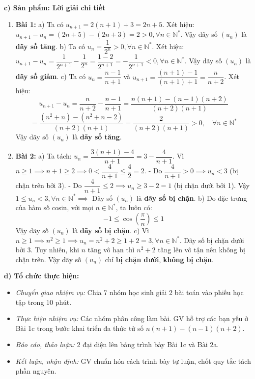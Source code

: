 \documentclass[12pt, a4paper]{article}
\begin{document}
\noindent \textbf{c) Sản phẩm: Lời giải chi tiết}  
\begin{enumerate}[leftmargin=0.6cm]  
    \item \textbf{Bài 1:}  
    a) Ta có $u_{n+1} = 2(n + 1) + 3 = 2n + 5$.  
    Xét hiệu: $u_{n+1} - u_n = (2n + 5) - (2n + 3) = 2 > 0, \forall n \in \mathbb{N}^*$.  
    Vậy dãy số $(u_n)$ là \textbf{dãy số tăng}.  
    b) Ta có $u_n = \dfrac{1}{2^n} > 0, \forall n \in \mathbb{N}^*$.  
    Xét hiệu: $u_{n+1} - u_n = \dfrac{1}{2^{n+1}} - \dfrac{1}{2^n} = \dfrac{1 - 2}{2^{n+1}} = -\dfrac{1}{2^{n+1}} < 0, \forall n \in \mathbb{N}^*$.  
    Vậy dãy số $(u_n)$ là \textbf{dãy số giảm}.  
    c) Ta có $u_n = \dfrac{n - 1}{n + 1}$ và $u_{n+1} = \dfrac{(n + 1) - 1}{(n + 1) + 1} = \dfrac{n}{n + 2}$.  
    Xét hiệu:  
    $$u_{n+1} - u_n = \dfrac{n}{n + 2} - \dfrac{n - 1}{n + 1} = \dfrac{n(n + 1) - (n - 1)(n + 2)}{(n + 2)(n + 1)}$$  
    $$= \dfrac{(n^2 + n) - (n^2 + n - 2)}{(n + 2)(n + 1)} = \dfrac{2}{(n + 2)(n + 1)} > 0, \quad \forall n \in \mathbb{N}^*$$  
    Vậy dãy số $(u_n)$ là \textbf{dãy số tăng}.  
  
    \item \textbf{Bài 2:}  
    a) Ta tách: $u_n = \dfrac{3(n + 1) - 4}{n + 1} = 3 - \dfrac{4}{n + 1}$.  
    Vì $n \ge 1 \implies n + 1 \ge 2 \implies 0 < \dfrac{4}{n + 1} \le \dfrac{4}{2} = 2$.  
    - Do $\dfrac{4}{n+1} > 0 \implies u_n < 3$ (bị chặn trên bởi 3).  
    - Do $\dfrac{4}{n+1} \le 2 \implies u_n \ge 3 - 2 = 1$ (bị chặn dưới bởi 1).  
    Vậy $1 \le u_n < 3, \forall n \in \mathbb{N}^* \implies$ Dãy số $(u_n)$ là \textbf{dãy số bị chặn}.  
    b) Do đặc trưng của hàm số cosin, với mọi $n \in \mathbb{N}^*$, ta luôn có:  
    $$-1 \le \cos\left(\dfrac{\pi}{n}\right) \le 1$$  
    Vậy dãy số $(u_n)$ là \textbf{dãy số bị chặn}.  
    c) Vì $n \ge 1 \implies n^2 \ge 1 \implies u_n = n^2 + 2 \ge 1 + 2 = 3, \forall n \in \mathbb{N}^*$.  
    Dãy số bị chặn dưới bởi 3. Tuy nhiên, khi $n$ tăng vô hạn thì $n^2 + 2$ tăng lên vô tận nên không bị chặn trên.  
    Vậy dãy số $(u_n)$ chỉ \textbf{bị chặn dưới}, \textbf{không bị chặn}.  
\end{enumerate}  
  
\noindent \textbf{d) Tổ chức thực hiện:}  
\begin{itemize}[leftmargin=0.8cm]  
    \item \textit{Chuyển giao nhiệm vụ:} Chia 7 nhóm học sinh giải 2 bài toán vào phiếu học tập trong 10 phút.  
    \item \textit{Thực hiện nhiệm vụ:} Các nhóm phân công làm bài. GV hỗ trợ các bạn yếu ở Bài 1c trong bước khai triển đa thức tử số $n(n+1) - (n-1)(n+2)$.  
    \item \textit{Báo cáo, thảo luận:} 2 đại diện lên bảng trình bày Bài 1c và Bài 2a.  
    \item \textit{Kết luận, nhận định:} GV chuẩn hóa cách trình bày tự luận, chốt quy tắc tách phần nguyên.  
\end{itemize}  
  
\end{document}
